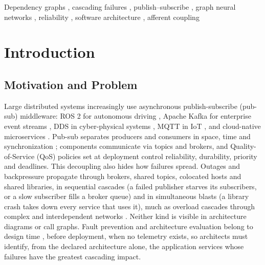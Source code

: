 \documentclass[preprint,3p]{elsarticle}
\begin{document}
\begin{frontmatter}
\begin{abstract}
\end{abstract}

\begin{keyword}
Dependency graphs \sep
cascading failures \sep
publish--subscribe \sep
graph neural networks \sep
reliability \sep
software architecture \sep
afferent coupling
\end{keyword}

\end{frontmatter}

\linenumbers

\section{Introduction}
\label{sec:1}

\subsection{Motivation and Problem}
\label{sec:1.1}

Large distributed systems increasingly use asynchronous publish-subscribe (pub-sub) middleware: ROS 2 for autonomous driving \cite{macenski2022robot}, Apache Kafka for enterprise event streams \cite{kreps2011kafka}, DDS in cyber-physical systems \cite{omg2015dds}, MQTT in IoT \cite{oasis2019mqtt}, and cloud-native microservices \cite{dragoni2017microservices,newman2015building}. Pub-sub separates producers and consumers in space, time and synchronization \cite{eugster2003faces}; components communicate via topics and brokers, and Quality-of-Service (QoS) policies set at deployment control reliability, durability, priority and deadlines. This decoupling also hides how failures spread. Outages and backpressure propagate through brokers, shared topics, colocated hosts and shared libraries, in sequential cascades (a failed publisher starves its subscribers, or a slow subscriber fills a broker queue) and in simultaneous blasts (a library crash takes down every service that uses it), much as overload cascades through complex and interdependent networks \cite{motter2002cascade,buldyrev2010cascade}. Neither kind is visible in architecture diagrams or call graphs. Fault prevention and architecture evaluation belong to design time \cite{avizienis2004basic,bass2012software}, before deployment, when no telemetry exists, so architects must identify, from the declared architecture alone, the application services whose failures have the greatest cascading impact.
\end{document}
